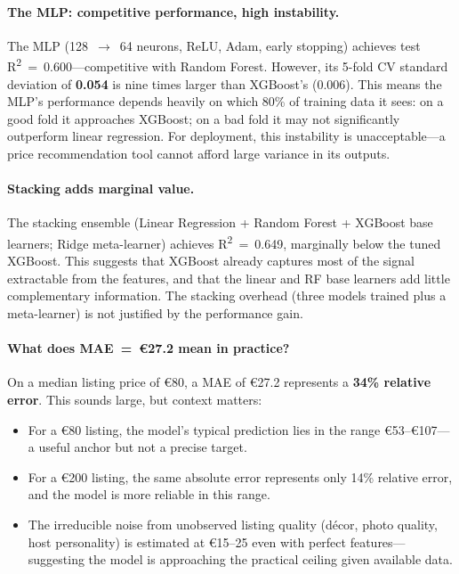 \documentclass[12pt, a4paper]{article}
\begin{document}
\paragraph{The MLP: competitive performance, high instability.}
The MLP (128~$\rightarrow$~64 neurons, ReLU, Adam, early stopping) achieves test R\textsuperscript{2}~=~0.600---competitive with Random Forest. However, its 5-fold CV standard deviation of \textbf{0.054} is nine times larger than XGBoost's (0.006). This means the MLP's performance depends heavily on which 80\% of training data it sees: on a good fold it approaches XGBoost; on a bad fold it may not significantly outperform linear regression. For deployment, this instability is unacceptable---a price recommendation tool cannot afford large variance in its outputs.

\paragraph{Stacking adds marginal value.}
The stacking ensemble (Linear Regression + Random Forest + XGBoost base learners; Ridge meta-learner) achieves R\textsuperscript{2}~=~0.649, marginally below the tuned XGBoost. This suggests that XGBoost already captures most of the signal extractable from the features, and that the linear and RF base learners add little complementary information. The stacking overhead (three models trained plus a meta-learner) is not justified by the performance gain.

\paragraph{What does MAE~=~\euro{}27.2 mean in practice?}
On a median listing price of \euro{}80, a MAE of \euro{}27.2 represents a \textbf{34\% relative error}. This sounds large, but context matters:
\begin{itemize}[itemsep=2pt]
  \item For a \euro{}80 listing, the model's typical prediction lies in the range \euro{}53--\euro{}107---a useful anchor but not a precise target.
  \item For a \euro{}200 listing, the same absolute error represents only 14\% relative error, and the model is more reliable in this range.
  \item The irreducible noise from unobserved listing quality (décor, photo quality, host personality) is estimated at \euro{}15--25 even with perfect features---suggesting the model is approaching the practical ceiling given available data.
\end{itemize}
\end{document}
